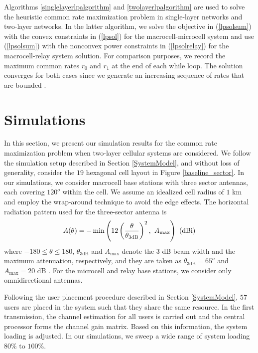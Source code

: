 \documentclass[conference,letterpaper,final,10pt]{IEEEtran}
\begin{document}
Algorithms \ref{singlelayerlpalgorithm} and \ref{twolayerlpalgorithm} are used to solve the heuristic common rate maximization problem in single-layer networks and two-layer networks. In the latter algorithm, we solve the objective in (\ref{lpsolsum}) with the convex constraints in (\ref{lpsol}) for the macrocell-microcell system and use (\ref{lpsolsum}) with the nonconvex power constraints in (\ref{lpsolrelay}) for the macrocell-relay system solution. For comparison purposes, we record the maximum common rates $r_0$ and $r_1$ at the end of each while loop. The solution converges for both cases since we generate an increasing sequence of rates that are bounded \cite{RamanConf}.

\section{Simulations}\label{Simulations}
In this section, we present our simulation results for the common rate maximization problem when two-layer cellular systems are considered.
We follow the simulation setup described in Section \ref{SystemModel}, and without loss of generality, consider the $19$ hexagonal cell layout in Figure \ref{baseline_sector}. In our simulations, we consider macrocell base stations with three sector antennas, each covering $120^o$ within the cell. We assume an idealized cell radius of $1$ km and employ the wrap-around technique to avoid the edge effects. The horizontal radiation pattern used for the three-sector antenna is
\begin{align} A(\theta) = - \min \left(12 \left( \frac{\theta}{\theta_{3\mathrm{dB}}}\right)^2, \hspace{.05in} A_{\max}\right) \hspace{.05in} (\mathrm{dBi}) \end{align}
where $-180 \leq \theta \leq 180$, $\theta_{3\mathrm{dB}}$ and
$A_{\max}$ denote the $3$ dB beam width and the maximum
attenuation, respectively, and they are taken as
$\theta_{3\mathrm{dB}}=65^o$ and $A_{\max} = 20$ dB \cite{UmtsCostHataWI}. For the microcell and relay base stations, we consider only omnidirectional antennas.

Following the user placement procedure described in Section \ref{SystemModel}, $57$ users are placed in the system such that they share the same resource. In the first transmission, the channel estimation for all users is carried out and the central processor forms the channel gain matrix. Based on this information, the system loading is adjusted. In our simulations, we sweep a wide range of system loading $80\%$ to $100\%$.
\end{document}
